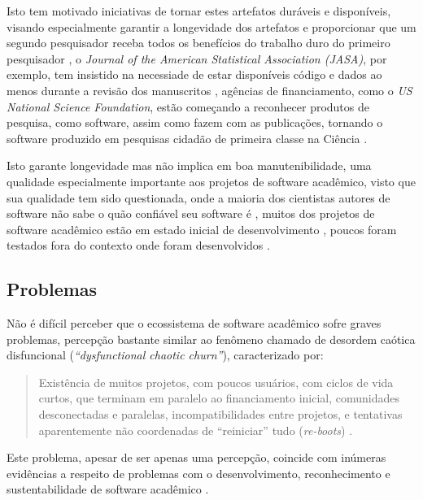 Isto tem motivado iniciativas de tornar estes artefatos duráveis e disponíveis,
visando especialmente garantir a longevidade dos artefatos e proporcionar que
um segundo pesquisador receba todos os benefícios do trabalho duro do primeiro
pesquisador \cite{king1995replication},
o {\it Journal of the American Statistical Association (JASA)}, por
exemplo, tem insistido na necessiade de estar disponíveis código e dados ao
menos durante a revisão dos manuscritos \cite{baker2016scientists}, agências de
financiamento, como o {\it US National Science Foundation}, estão começando a
reconhecer produtos de pesquisa, como software, assim como fazem com as
publicações, tornando o software produzido em pesquisas cidadão de primeira
classe na Ciência \cite{allen2017engineering}.

Isto garante longevidade mas não implica em boa manutenibilidade, uma qualidade especialmente
importante aos projetos de software acadêmico, visto que sua qualidade tem sido questionada, onde a maioria dos cientistas autores
de software não sabe o quão confiável seu software é
\cite{merali2010computational}, muitos dos projetos de software acadêmico estão
em estado inicial de desenvolvimento \cite{marshall2013tools}, poucos foram
testados fora do contexto onde foram desenvolvidos \cite{portillo2012tools}.

\subsection{Problemas}

Não é difícil perceber que o ecossistema de software acadêmico sofre graves
problemas, percepção bastante similar ao fenômeno chamado de  desordem
caótica disfuncional ({\it ``dysfunctional chaotic churn''}), caracterizado
por:

\begin{quote}
Existência de muitos projetos, com poucos usuários, com
ciclos de vida curtos, que terminam em paralelo ao financiamento inicial,
comunidades desconectadas e paralelas, incompatibilidades entre projetos, e
tentativas aparentemente não coordenadas de ``reiniciar'' tudo ({\it re-boots})
\cite{howison2015understanding}.
\end{quote}

Este problema, apesar de ser apenas uma percepção, coincide com inúmeras
evidências a respeito de problemas com o desenvolvimento, reconhecimento e
sustentabilidade de software acadêmico \cite{allen2017engineering}.


